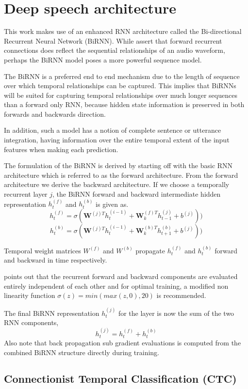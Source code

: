 \section{Deep speech architecture}

This work makes use of an enhanced RNN architecture called the Bi-directional Recurrent Neural Network (BiRNN). While \cite{hannun2014first} assert that forward recurrent connections does reflect the sequential relationships of an audio waveform, perhaps the BiRNN model poses a more powerful sequence model.

The BiRNN is a preferred end to end mechanism due to the length of sequence over which temporal relationships can be captured.  This implies that BiRNNs will be suited for capturing temporal relationships over much longer sequences than a forward only RNN, because hidden state information is preserved in both forwards and backwards direction. 

In addition, such a model has a notion of complete sentence or utterance  integration, having information over the entire temporal extent of the input features when making each prediction. 

The formulation of the BiRNN is derived by starting off with the basic RNN architecture which is referred to as the forward architecture.  From the forward architecture we derive the backward architecture. If we choose a temporally recurrent layer $j$, the BiRNN forward and backward intermediate hidden representation $h^{(f)}_t$ and $h^{(b)}_t$ is given as. 
\begin{equation}h_t^{(f)}=\sigma(\mathbf{W}^{(j)T}h_t^{(i-1)}+\mathbf{W}^{(f)T}_kh_{t-1}^{(j)}+b^{(j)}))
\label{eqn_c3_ds01}\end{equation}
\begin{equation}h_t^{(b)}=\sigma(\mathbf{W}^{(j)T}h_t^{(i-1)}+\mathbf{W}^{(b)T}_kh_{t+1}^{(b)}+b^{(j)}))
\label{eqn_c3_ds02}\end{equation}

Temporal weight matrices $W^{(f)}$ and $W^{(b)}$ propagate $h^{(f)}_t$  and $h^{(b)}_t$ forward and backward in time respectively. 

\cite{hannun2014first} points out that the recurrent forward and backward components are evaluated entirely independent of each other and for optimal training, a modified non linearity function $\sigma(z) = min(max(z, 0), 20)$ is recommended. 

The final BiRNN representation $h^{(j)}_t$ for the layer is now the sum of the two RNN components,
 \begin{equation}h_t^{(j)}=h_t^{(f)}+h_t^{(b)}
\label{eqn_c3_ds03}\end{equation}
Also note that back propagation sub gradient evaluations is computed from the combined BiRNN structure directly during training.

\subsection{Connectionist Temporal Classification (CTC)}
